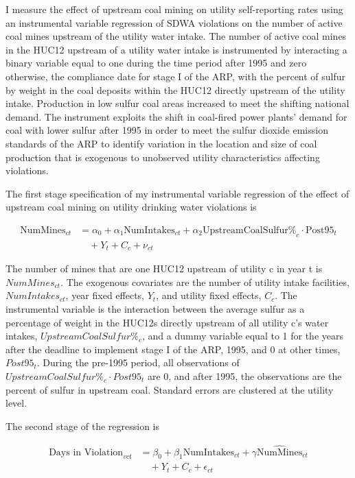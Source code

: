 \documentclass{article}
\begin{document}
I measure the effect of upstream coal mining on utility self-reporting rates using an instrumental variable regression of SDWA violations on the number of active coal mines upstream of the utility water intake. The number of active coal mines in the HUC12 upstream of a utility water intake is instrumented by interacting a binary variable equal to one during the time period after 1995 and zero otherwise, the compliance date for stage I of the ARP, with the percent of sulfur by weight in the coal deposits within the HUC12 directly upstream of the utility intake. Production in low sulfur coal areas increased to meet the shifting national demand. The instrument exploits the shift in coal-fired power plants' demand for coal with lower sulfur after 1995 in order to meet the sulfur dioxide emission standards of the ARP to identify variation in the location and size of coal production that is exogenous to unobserved utility characteristics affecting violations.

The first stage specification of my instrumental variable regression of the effect of upstream coal mining on utility drinking water violations is

\begin{equation}\label{1ststage2sls}
\begin{split}
\text{NumMines}_{ct} &= \alpha_0 + \alpha_1\text{NumIntakes}_{ct} + \alpha_2\text{UpstreamCoalSulfur\%}_c \cdot \text{Post95}_t \\
&\quad + Y_t + C_c + \nu_{ct}
\end{split}
\end{equation}

The number of mines that are one HUC12 upstream of utility c in year t is $NumMines_{ct}$. The exogenous covariates are the number of utility intake facilities, $NumIntakes_{ct}$, year fixed effects, $Y_t$, and utility fixed effects, $C_c$. The instrumental variable is the interaction between the average sulfur as a percentage of weight in the HUC12s directly upstream of all utility c's water intakes, $UpstreamCoalSulfur\%_c$, and a dummy variable equal to 1 for the years after the deadline to implement stage I of the ARP, 1995, and 0 at other times, $Post95_t$. During the pre-1995 period, all observations of $UpstreamCoalSulfur\%_c \cdot Post95_t$ are 0, and after 1995, the observations are the percent of sulfur in upstream coal. Standard errors are clustered at the utility level. 

The second stage of the regression is

\begin{equation}\label{2ndstage2sls}
\begin{split}
\text{Days in Violation}_{vct} &= \beta_0 + \beta_1\text{NumIntakes}_{ct} + \gamma\widehat{\text{NumMines}}_{ct} \\
&\quad + Y_t + C_c + \epsilon_{ct}
\end{split}
\end{equation}
\end{document}
